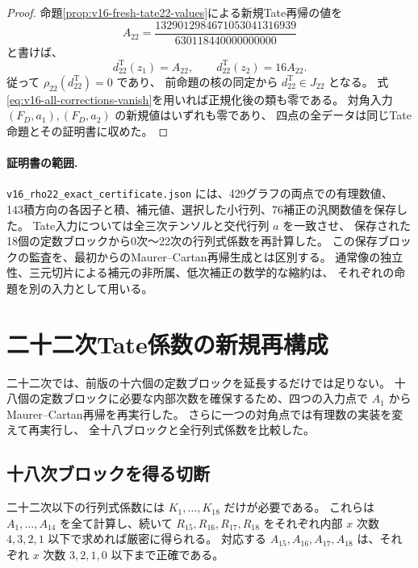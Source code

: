 \begin{proof}
命題\ref{prop:v16-fresh-tate22-values}による新規Tate再帰の値を
\[
 A_{22}=\frac{1329012984671053041316939}{630118440000000000}
\]
と書けば、
\[
             d_{22}^{\mathrm T}(z_1)=A_{22},\qquad
             d_{22}^{\mathrm T}(z_2)=16A_{22}.
\]
従って $\rho_{22}(d_{22}^{\mathrm T})=0$ であり、
前命題の核の同定から $d_{22}^{\mathrm T}\in J_{22}$ となる。
式\eqref{eq:v16-all-corrections-vanish}を用いれば正規化後の類も零である。
対角入力 $(F_D,a_1),(F_D,a_2)$ の新規値はいずれも零であり、
四点の全データは同じTate命題とその証明書に収めた。
\end{proof}

\paragraph{証明書の範囲.}
\nolinkurl{v16_rho22_exact_certificate.json} には、429グラフの両点での有理数値、
143積方向の各因子と積、補元値、選択した小行列、76補正の汎関数値を保存した。
Tate入力については全三次テンソルと交代行列 $a$ を一致させ、
保存された18個の定数ブロックから0次〜22次の行列式係数を再計算した。
この保存ブロックの監査を、最初からのMaurer--Cartan再帰生成とは区別する。
通常像の独立性、三元切片による補元の非所属、低次補正の数学的な縮約は、
それぞれの命題を別の入力として用いる。



\section{二十二次Tate係数の新規再構成}
\label{sec:v16-tate-twentysecond}

二十二次では、前版の十六個の定数ブロックを延長するだけでは足りない。
十八個の定数ブロックに必要な内部次数を確保するため、四つの入力点で
$A_1$ からMaurer--Cartan再帰を再実行した。
さらに一つの対角点では有理数の実装を変えて再実行し、
全十八ブロックと全行列式係数を比較した。

\subsection{十八次ブロックを得る切断}

\begin{lemma}[二十二次の厳密な内部次数切断]
\label{lem:v16-tate22-truncation}
二十二次以下の行列式係数には $K_1,\ldots,K_{18}$ だけが必要である。
これらは $A_1,\ldots,A_{14}$ を全て計算し、続いて
$R_{15},R_{16},R_{17},R_{18}$ をそれぞれ内部 $x$ 次数
$4,3,2,1$ 以下で求めれば厳密に得られる。
対応する $A_{15},A_{16},A_{17},A_{18}$ は、それぞれ
$x$ 次数 $3,2,1,0$ 以下まで正確である。
\end{lemma}

